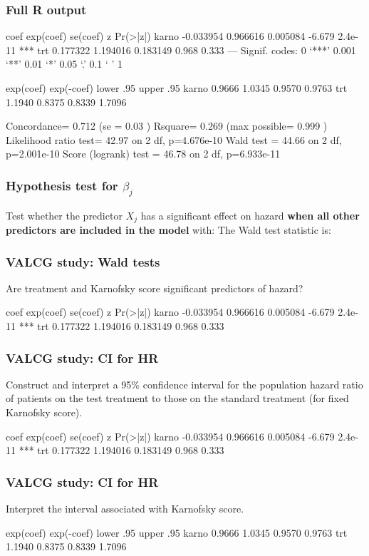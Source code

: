 \begin{frame}[fragile]
\frametitle{Full R output}
\begin{Rout}{.0}

           coef exp(coef)  se(coef)      z Pr(>|z|)
karno -0.033954  0.966616  0.005084 -6.679  2.4e-11 ***
trt    0.177322  1.194016  0.183149  0.968    0.333
---
Signif. codes:  0 ‘***’ 0.001 ‘**’ 0.01 ‘*’ 0.05 ‘.’ 0.1 ‘ ’ 1

      exp(coef) exp(-coef) lower .95 upper .95
karno    0.9666     1.0345    0.9570    0.9763
trt      1.1940     0.8375    0.8339    1.7096

Concordance= 0.712  (se = 0.03 )
Rsquare= 0.269   (max possible= 0.999 )
Likelihood ratio test= 42.97  on 2 df,   p=4.676e-10
Wald test            = 44.66  on 2 df,   p=2.001e-10
Score (logrank) test = 46.78  on 2 df,   p=6.933e-11
\end{Rout}
\end{frame}

\begin{frame}
\frametitle{Hypothesis test for $\beta_j$}
Test whether the predictor $X_j$ has a significant effect on hazard \textbf{when all other predictors are included in the model} with:
\vskip70pt
The Wald test statistic is:
\vskip70pt
\end{frame}

\begin{frame}[fragile]
\frametitle{VALCG study: Wald tests}
Are treatment and Karnofsky score significant predictors of hazard?
\begin{Rout}{-.07}
           coef exp(coef)  se(coef)      z Pr(>|z|)
karno -0.033954  0.966616  0.005084 -6.679  2.4e-11 ***
trt    0.177322  1.194016  0.183149  0.968    0.333
\end{Rout}
\vskip200pt
\end{frame}

\begin{frame}[fragile]
\frametitle{VALCG study: CI for HR}
Construct and interpret a 95\% confidence interval for the population hazard ratio of patients on the test treatment to those on the standard treatment (for fixed Karnofsky score).
\begin{Rout}{-.07}
           coef exp(coef)  se(coef)      z Pr(>|z|)
karno -0.033954  0.966616  0.005084 -6.679  2.4e-11 ***
trt    0.177322  1.194016  0.183149  0.968    0.333
\end{Rout}
\vskip200pt
\end{frame}

\begin{frame}[fragile]
\frametitle{VALCG study: CI for HR}
Interpret the interval associated with Karnofsky score.
\begin{Rout}{-.07}
      exp(coef) exp(-coef) lower .95 upper .95
karno    0.9666     1.0345    0.9570    0.9763
trt      1.1940     0.8375    0.8339    1.7096
\end{Rout}
\vskip200pt
\end{frame}

